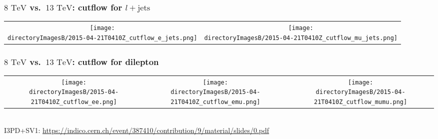 
%
%

\begin{frame}
\frametitle{${8\textrm{ TeV}}$ vs.~${13\textrm{ TeV}}$: cutflow for ${l+\textrm{jets}}$}
\begin{center}
\begin{tabular}{cc}
\texttt{[image: \\directoryImagesB/2015-04-21T0410Z\_cutflow\_e\_jets.png]}&\texttt{[image: \\directoryImagesB/2015-04-21T0410Z\_cutflow\_mu\_jets.png]}\\
\end{tabular}
\end{center}
\end{frame}

\begin{frame}
\frametitle{${8\textrm{ TeV}}$ vs.~${13\textrm{ TeV}}$: cutflow for dilepton}
\begin{center}
\begin{tabular}{ccc}
\texttt{[image: \\directoryImagesB/2015-04-21T0410Z\_cutflow\_ee.png]}&\texttt{[image: \\directoryImagesB/2015-04-21T0410Z\_cutflow\_emu.png]}&
\texttt{[image: \\directoryImagesB/2015-04-21T0410Z\_cutflow\_mumu.png]}\\
\end{tabular}
\vspace{0.5 cm}\\I3PD+SV1: \url{https://indico.cern.ch/event/387410/contribution/9/material/slides/0.pdf}
\end{center}
\end{frame}

